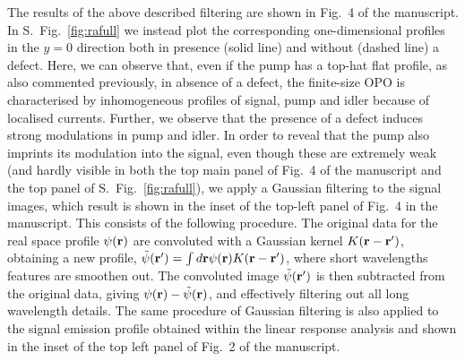 The results of the above described filtering are shown in Fig.~4 of
the manuscript.
%
In S.~Fig.~\ref{fig:rafull} we instead plot the corresponding
one-dimensional profiles in the $y=0$ direction both in presence
(solid line) and without (dashed line) a defect. Here, we can observe
that, even if the pump has a top-hat flat profile, as also commented
previously, in absence of a defect, the finite-size OPO is
characterised by inhomogeneous profiles of signal, pump and idler
because of localised currents. Further, we observe that the presence
of a defect induces strong modulations in pump and idler.
%
In order to reveal that the pump also imprints its modulation into the
signal, even though these are extremely weak (and hardly visible in
both the top main panel of Fig.~4 of the manuscript and the top panel
of S.~Fig.~\ref{fig:rafull}), we apply a Gaussian filtering to the
signal images, which result is shown in the inset of the top-left
panel of Fig.~4 in the manuscript.
%
This consists of the following procedure. The original data for the
real space profile $\psi({\mathbf r})$ are convoluted with a Gaussian
kernel $K({\mathbf r} - {\mathbf r}')$, obtaining a new profile,
$\tilde{\psi}({\mathbf r}') = \int d{\mathbf r} \psi ({\mathbf r}) K({\mathbf r} -
{\mathbf r}')$, where short wavelengths features are smoothen out. The
convoluted image $\tilde{\psi}({\mathbf r}')$ is then subtracted from the
original data, giving $\psi({\mathbf r}) - \tilde{\psi}({\mathbf r})$, and
effectively filtering out all long wavelength details.
%
The same procedure of Gaussian filtering is also applied to the signal
emission profile obtained within the linear response analysis and
shown in the inset of the top left panel of Fig.~2 of the manuscript.

